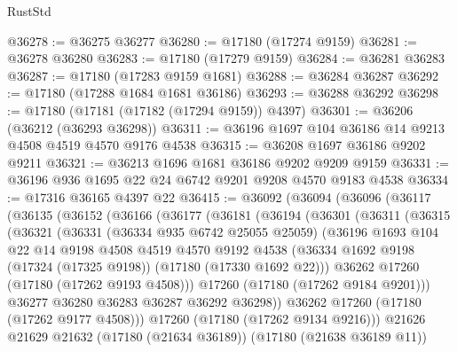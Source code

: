 \begin{lexlean}{RustStd}
\begin{coremodule}
{\begin{coremodule}
{{{{{{{{{{{{{{{{{{{{{{{{{{{{{{{{{{{{{{{{{{{{{{{{{{{{{{{@36278 := @36275 @36277
@36280 := @17180 (@17274 @9159)
@36281 := @36278 @36280
@36283 := @17180 (@17279 @9159)
@36284 := @36281 @36283
@36287 := @17180 (@17283 @9159 @1681)
@36288 := @36284 @36287
@36292 := @17180 (@17288 @1684 @1681 @36186)
@36293 := @36288 @36292
@36298 := @17180 (@17181 (@17182 (@17294 @9159)) @4397)
@36301 := @36206 (@36212 (@36293 @36298))
@36311 := @36196 @1697 @104 @36186 @14 @9213 @4508 @4519 @4570 @9176 @4538
@36315 := @36208 @1697 @36186 @9202 @9211
@36321 := @36213 @1696 @1681 @36186 @9202 @9209 @9159
@36331 := @36196 @936 @1695 @22 @24 @6742 @9201 @9208 @4570 @9183 @4538
@36334 := @17316 @36165 @4397 @22
@36415 := @36092
    (@36094
      (@36096
        (@36117
          (@36135
            (@36152
              (@36166
                (@36177
                  (@36181
                    (@36194
                      (@36301
                        (@36311
                          (@36315
                            (@36321
                              (@36331
                                (@36334 @935 @6742 @25055 @25059)
                                (@36196
                                  @1693
                                  @104
                                  @22
                                  @14
                                  @9198
                                  @4508
                                  @4519
                                  @4570
                                  @9192
                                  @4538
                                  (@36334
                                    @1692
                                    @9198
                                    (@17324 (@17325 @9198))
                                    (@17180 (@17330 @1692 @22)))
                                  @36262
                                  @17260
                                  (@17180 (@17262 @9193 @4508)))
                                @17260
                                (@17180 (@17262 @9184 @9201)))
                              @36277
                              @36280
                              @36283
                              @36287
                              @36292
                              @36298))
                          @36262
                          @17260
                          (@17180 (@17262 @9177 @4508)))
                        @17260
                        (@17180 (@17262 @9134 @9216)))
                      @21626
                      @21629
                      @21632
                      (@17180 (@21634 @36189))
                      (@17180 (@21638 @36189 @11))
}}}}}}}}}}}}}}}}}}}}}}}}}}}}}}}}}}}}}}}}}}}}}}}}}}}}}}}
\end{coremodule}}
\end{coremodule}
\end{lexlean}
